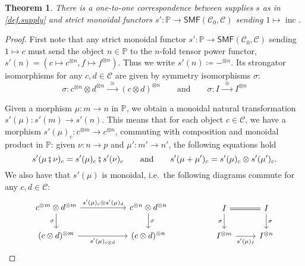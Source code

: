 \documentclass[11pt, oneside, article]{memoir}
\theoremstyle{plain}
\newtheorem{theorem}{Theorem}[chapter]
\theoremstyle{definition}
\theoremstyle{remark}
\newcommand{\cat}[1]{\mathcal{#1}}%
\newcommand{\Cat}[1]{{\mathsf{#1}}}%
\DeclareMathOperator{\inc}{inc}
\newcommand{\tpow}[1]{^{\otimes #1}}
\newcommand{\smf}{\Cat{SMF}}
\newcommand{\pp}{\mathbb{P}}
\newcommand{\mob}[1]{#1_0}
\newcommand{\cp}{\mathbin{\fatsemi}}
\newcommand{\To}[1]{\xrightarrow{#1}}
\newcommand{\Too}[1]{\To{\;\;#1\;\;}}
\newcommand{\qqand}{\qquad\text{and}\qquad}
\begin{document}
\begin{theorem}\label{thm.supply_v2}
There is a one-to-one correspondence between supplies $s$ as in \cref{def.supply} and strict monoidal functors $s'\colon\pp\to\smf(\mob{\cat{C}},\cat{C})$ sending $1\mapsto\inc$.
\end{theorem}\begin{proof}
First note that any strict monoidal functor $s'\colon\pp\to\smf(\mob{\cat{C}},\cat{C})$ sending $1\mapsto c$ must send the object $n\in\pp$ to the $n$-fold tensor power functor, $s'(n)=(c\mapsto c\tpow{n}, f\mapsto f\tpow{n})$. Thus we write $s'(n)\coloneqq -\tpow{n}$. Its strongator isomorphisms for any $c,d\in\cat{C}$ are given by symmetry isomorphisms $\sigma$:
\begin{equation}\label{eqn.symmetry_c1c2}
  \sigma\colon 
  c\tpow{n}\otimes d\tpow{n}
  \Too{\cong}
  (c\otimes d)\tpow{n}
  \qqand
  \sigma\colon I\Too{\cong}I\tpow{n}
\end{equation}

Given a morphism $\mu\colon m\to n$ in $\pp$, we obtain a monoidal natural transformation $s'(\mu)\colon s'(m)\to s'(n)$. This means that for each object $c\in\cat{C}$, we have a morphism $s'(\mu)_c\colon c\tpow{m}\to c\tpow{n}$, commuting with composition and monoidal product in $\pp$: given $\nu\colon n\to p$ and $\mu'\colon m'\to n'$, the following equations hold
\begin{equation}\label{eqn.supply_composition}
  s'(\mu\cp\nu)_c=s'(\mu)_c\cp s'(\nu)_c
  \qqand
	s'(\mu+\mu')_c=s'(\mu)_c\otimes s'(\mu')_c.
\end{equation}
We also have that  $s'(\mu)$ is monoidal, i.e.\ the following diagrams commute for any $c,d\in\cat{C}$:
\begin{equation}\label{eqn.supply_commute_tensors_v2}
\begin{tikzcd}[column sep=55pt]
	c\tpow{m}\otimes d\tpow{m}\ar[r, "s'(\mu)_c\otimes s'(\mu)_d"]\ar[d, "\sigma"']&
	c\tpow{n}\otimes d\tpow{n}\ar[d, "\sigma"]\\
	(c\otimes d)\tpow{m}\ar[r, "s'(\mu)_{c\otimes d}"']&
	(c\otimes d)\tpow{n}
\end{tikzcd}
\hspace{.7in}
\begin{tikzcd}
	I\ar[r, equal]\ar[d, "\sigma"']&
	I\ar[d, "\sigma"]\\
	I\tpow{m}\ar[r, "s'(\mu)_I"']&
	I\tpow{n}
\end{tikzcd}
\end{equation}
 

\end{proof}
\end{document}
